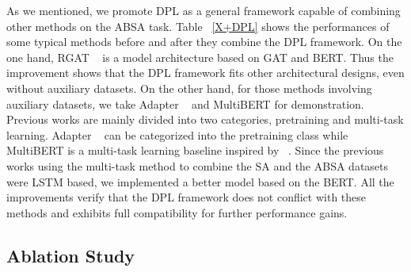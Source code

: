 \documentclass[11pt]{article}
\begin{document}
As we mentioned, we promote DPL as a general framework capable of combining other methods on the ABSA task. Table ~\ref{X+DPL} shows the performances of some typical methods before and after they combine the DPL framework. 
On the one hand, RGAT ~\cite{bai2020investigating} is a model architecture based on GAT and BERT. Thus the improvement shows that the DPL framework fits other architectural designs, even without auxiliary datasets.
On the other hand, for those methods involving auxiliary datasets, we take Adapter ~\cite{rietzler2019adapt} and MultiBERT for demonstration. 
Previous works are mainly divided into two categories, pretraining and multi-task learning. Adapter ~\cite{rietzler2019adapt} can be categorized into the pretraining class while MultiBERT is a multi-task learning baseline inspired by ~\citet{he2018exploiting}.
Since the previous works using the multi-task method to combine the SA and the ABSA datasets were LSTM based, we implemented a better model based on the BERT.
All the improvements verify that the DPL framework does not conflict with these methods and exhibits full compatibility for further performance gains.

\subsection{Ablation Study}
\begin{table}
\centering
{}
\caption{ Results of ablation study. ``Restaurant'' takes plain BERT as the initial model while ``Restaurant+Pre'' takes \citet{rietzler2019adapt}'s BERT as the initial model. ``DPL'' denotes our method. 
``Traditional Pseudo-Label'' represents we take the PL method for fine-grained tasks dropped out the coarse-grained labels. 
The last three cases named in the form of ``- X'' means that we deleted the ``X'' from the original DPL to evaluate the effect of ``X''.
}
\label{ablation}
\end{table}
\end{document}

